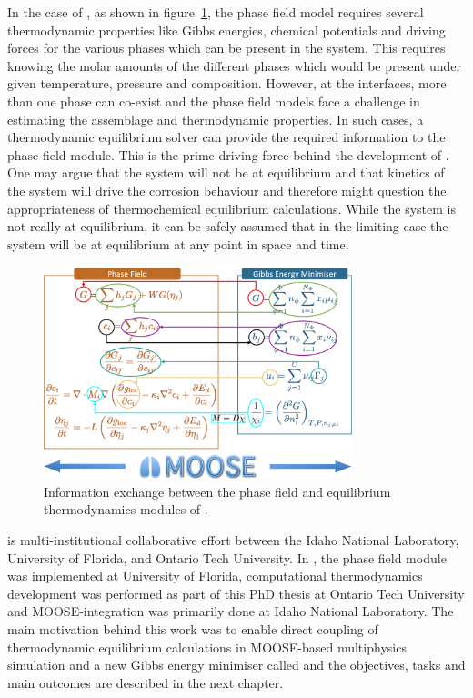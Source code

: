 	In the case of {\YJ}, as shown in figure~\ref{fig:yj_io}, the phase field model requires several thermodynamic properties like Gibbs energies, chemical potentials and driving forces for the various phases which can be present in the system. This requires knowing the molar amounts of the different phases which would be present under given temperature, pressure and composition. However, at the interfaces, more than one phase can co-exist and the phase field models face a challenge in estimating the assemblage and thermodynamic properties. In such cases, a thermodynamic equilibrium solver can provide the required information to the phase field module. This is the prime driving force behind the development of {\GEM}. One may argue that the system will not be at equilibrium and that kinetics of the system will drive the corrosion behaviour and therefore might question the appropriateness of thermochemical equilibrium calculations. While the system is not really at equilibrium, it can be safely assumed that in the limiting case the system will be at equilibrium at any point in space and time.
	\begin{figure}[htb]
		\centering
		\includegraphics[width=0.8\textwidth]{figures/chapter-1/YJ_PF_IO.png}
		\caption{Information exchange between the phase field and equilibrium thermodynamics modules of \YJ.}
		\label{fig:yj_io}
	\end{figure} 	

	{\YJ} is multi-institutional collaborative effort between the Idaho National Laboratory, University of Florida, and Ontario Tech University.  In {\YJ}, the phase field module was implemented at University of Florida, computational thermodynamics development was performed as part of this PhD thesis at Ontario Tech University and MOOSE-integration was primarily done at Idaho National Laboratory. The main motivation behind this work was to enable direct coupling of thermodynamic equilibrium calculations in MOOSE-based multiphysics simulation and a new Gibbs energy minimiser called {\GEM} and the objectives, tasks and main outcomes are described in the next chapter.
	
